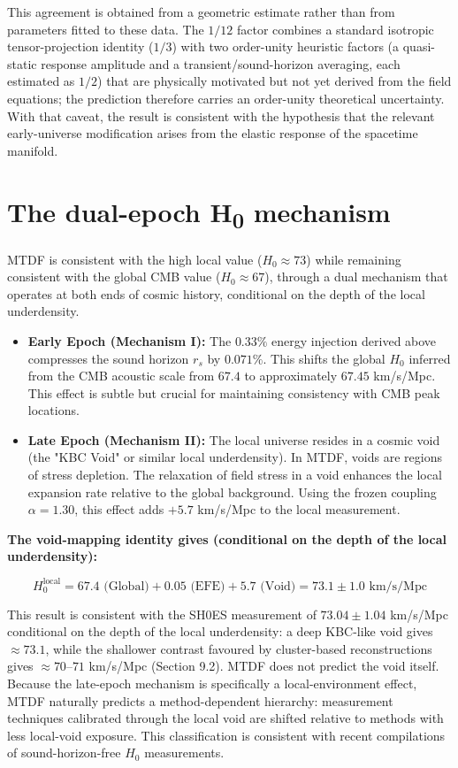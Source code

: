 \documentclass[11pt,a4paper]{article}
\begin{document}
This agreement is obtained from a geometric estimate rather than from parameters fitted to these data. The $1/12$ factor combines a standard isotropic tensor-projection identity ($1/3$) with two order-unity heuristic factors (a quasi-static response amplitude and a transient/\allowbreak{}sound-horizon averaging, each estimated as $1/2$) that are physically motivated but not yet derived from the field equations; the prediction therefore carries an order-unity theoretical uncertainty. With that caveat, the result is consistent with the hypothesis that the relevant early-universe modification arises from the elastic response of the spacetime manifold.

\section{The dual-epoch H\textsubscript{0} mechanism}
\label{sec:sec6}
MTDF is consistent with the high local value ($H_0 \approx 73$) while remaining consistent with the global CMB value ($H_0 \approx 67$), through a dual mechanism that operates at both ends of cosmic history, conditional on the depth of the local underdensity.

\begin{itemize}
  \item \textbf{Early Epoch (Mechanism I):} The $0.33\%$ energy injection derived above compresses the sound horizon $r_s$ by $0.071\%$. This shifts the global $H_0$ inferred from the CMB acoustic scale from $67.4$ to approximately $67.45$ km/\allowbreak{}s/\allowbreak{}Mpc. This effect is subtle but crucial for maintaining consistency with CMB peak locations.
  \item \textbf{Late Epoch (Mechanism II):} The local universe resides in a cosmic void (the "KBC Void" or similar local underdensity). In MTDF, voids are regions of stress depletion. The relaxation of field stress in a void enhances the local expansion rate relative to the global background. Using the frozen coupling $\alpha=1.30$, this effect adds $+5.7$ km/\allowbreak{}s/\allowbreak{}Mpc to the local measurement.
\end{itemize}

\textbf{The void-mapping identity gives (conditional on the depth of the local underdensity):}

$$ H_{0}^{\text{local}} = 67.4 \text{ (Global)} + 0.05 \text{ (EFE)} + 5.7 \text{ (Void)} = \mathbf{73.1 \pm 1.0} \text{ km/s/Mpc} $$

This result is consistent with the SH0ES measurement of $73.04 \pm 1.04$ km/\allowbreak{}s/\allowbreak{}Mpc conditional on the depth of the local underdensity: a deep KBC-like void gives $\approx 73.1$, while the shallower contrast favoured by cluster-based reconstructions gives $\approx 70$--$71$ km/\allowbreak{}s/\allowbreak{}Mpc (Section 9.2). MTDF does not predict the void itself. Because the late-epoch mechanism is specifically a local-environment effect, MTDF naturally predicts a method-dependent hierarchy: measurement techniques calibrated through the local void are shifted relative to methods with less local-void exposure. This classification is consistent with recent compilations of sound-horizon-free $H_0$ measurements.
\end{document}
